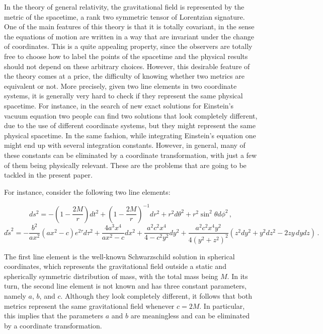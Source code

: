 \documentclass[twocolumn,prd,aps,showpacs,showkeys,amsmath,amssymb]{revtex4-1}
\begin{document}
In the theory of general relativity, the gravitational field is represented by the metric of the spacetime, a rank two symmetric tensor of Lorentzian signature. One of the main features of this theory is that it is totally covariant, in the sense the equations of motion are written in a way that are invariant under the change of coordinates. This is a quite appealing property, since the observers are totally free to choose how to label the points of the spacetime and the physical results should not depend on these arbitrary choices. However, this desirable feature of the theory comes at a price, the difficulty of knowing whether two metrics are equivalent or not. More precisely, given two line elements in two coordinate systems, it is generally very hard to check if they represent the same physical spacetime. For instance, in the search of new exact solutions for Einstein's vacuum equation two people can find two solutions that look completely different, due to the use of different coordinate systems, but they might represent the same physical spacetime. In the same fashion, while integrating Einstein's equation one might end up with several integration constants. However, in general, many of these constants can be eliminated by a coordinate transformation, with just a few of them being physically relevant. These are the problems that are going to be tackled in the present paper.



For instance, consider the following two line elements:
\begin{widetext}
\begin{equation}\label{Sch1}
  ds^2 = -\left(1-\frac{2M}{r} \right)dt^2 + \left(1-\frac{2M}{r} \right)^{-1}dr^2 + r^2 d\theta^2 + r^2 \sin^2\theta d\phi^2 \,,
\end{equation}
\begin{equation}\label{Sch2}
  d\tilde{s}^2 = - \frac{b^2}{ax^2}(a x^2 -c)e^{2\tau}d\tau^2 +  \frac{4a^3 x^4}{a x^2 -c} dx^2 +  \frac{a^2 c^2 x^4}{4 -c^2 y^2} dy^2
  +  \frac{a^2 c^2 x^4 y^2}{4(y^2 + z^2)^2} \left( z^2 dy^2 + y^2 dz^2 - 2 zy \,dydz  \right)  \,.
\end{equation}
\end{widetext}
The first line element is the well-known Schwarzschild solution in spherical coordinates, which represents the gravitational field outside a static and spherically symmetric distribution of mass, with the total mass being $M$. In its turn, the second line element is not known and has three constant parameters, namely $a$, $b$, and $c$. Although they look completely different, it follows that both metrics represent the same gravitational field whenever $c = 2M$. In particular, this implies that the parameters $a$ and $b$ are meaningless and can be eliminated by a coordinate transformation.
\end{document}
